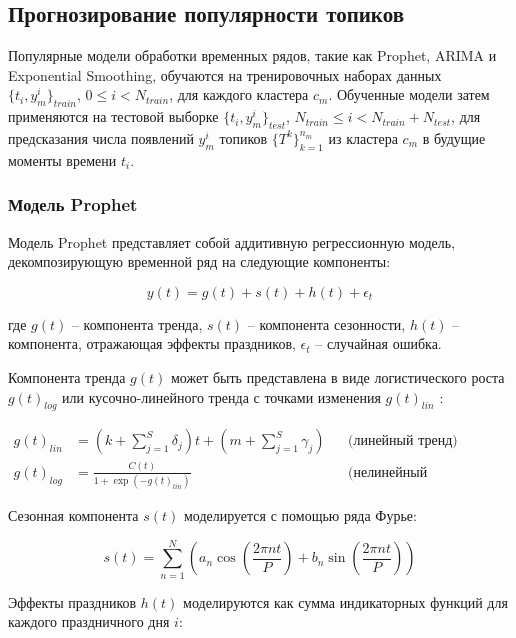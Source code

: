 \subsection{Прогнозирование популярности топиков}

Популярные модели обработки временных рядов, такие как Prophet, ARIMA и Exponential Smoothing, обучаются на тренировочных наборах данных $\{t_i, y_m^i\}_{train}$, $0 \leq i < N_{train}$, для каждого кластера $c_m$. Обученные модели затем применяются на тестовой выборке $\{t_i, y_m^i\}_{test}$, $N_{train} \leq i < N_{train} + N_{test}$, для предсказания числа появлений $y_m^i$ топиков $\{T^k\}_{k=1}^{n_m}$ из кластера $c_m$ в будущие моменты времени $t_i$.

\subsubsection{Модель Prophet}

Модель Prophet представляет собой аддитивную регрессионную модель, декомпозирующую временной ряд на следующие компоненты:

\begin{equation}
y(t) = g(t) + s(t) + h(t) + \epsilon_t
\end{equation}

где $g(t)$ -- компонента тренда, $s(t)$ -- компонента сезонности, $h(t)$ -- компонента, отражающая эффекты праздников, $\epsilon_t$ -- случайная ошибка.

Компонента тренда $g(t)$ может быть представлена в виде логистического роста $g(t)_{log}$ или кусочно-линейного тренда с точками изменения $g(t)_{lin}$ :

\begin{align}
g(t)_{lin} &= (k + \sum_{j=1}^S \delta_j)t + (m + \sum_{j=1}^S \gamma_j) &&\text{(линейный тренд)} \\
g(t)_{log} &= \frac{C(t)}{1 + \exp{(-g(t)_{lin})}} &&\text{(нелинейный логистический рост)}
\end{align}

Сезонная компонента $s(t)$ моделируется с помощью ряда Фурье:

\begin{equation}
s(t) = \sum_{n=1}^N \left(a_n \cos\left(\frac{2\pi n t}{P}\right) + b_n \sin\left(\frac{2\pi n t}{P}\right)\right)
\end{equation}

Эффекты праздников $h(t)$ моделируются как сумма индикаторных функций для каждого праздничного дня $i$:

